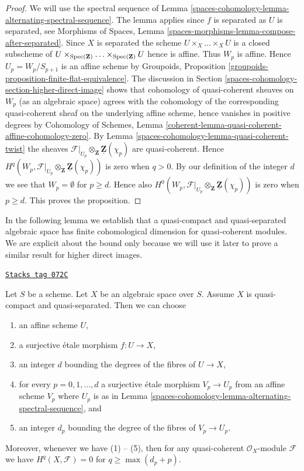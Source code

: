 \begin{proof}
We will use the spectral sequence of
Lemma \ref{spaces-cohomology-lemma-alternating-spectral-sequence}.
The lemma applies since $f$ is separated as $U$ is separated, see
Morphisms of Spaces, Lemma
\ref{spaces-morphisms-lemma-compose-after-separated}.
Since $X$ is separated the scheme $U \times_X \ldots \times_X U$ is a closed
subscheme of
$U \times_{\operatorname{Spec}(\mathbf{Z})} \ldots \times_{\operatorname{Spec}(\mathbf{Z})} U$
hence is affine. Thus $W_p$ is affine. Hence $U_p = W_p/S_{p + 1}$ is an
affine scheme by
Groupoids, Proposition \ref{groupoids-proposition-finite-flat-equivalence}.
The discussion in
Section \ref{spaces-cohomology-section-higher-direct-image}
shows that cohomology of quasi-coherent sheaves on $W_p$ (as an algebraic
space) agrees with the cohomology of the corresponding quasi-coherent
sheaf on the underlying affine scheme, hence vanishes in positive degrees by
Cohomology of Schemes, Lemma
\ref{coherent-lemma-quasi-coherent-affine-cohomology-zero}.
By
Lemma \ref{spaces-cohomology-lemma-quasi-coherent-twist}
the sheaves
$\mathcal{F}|_{U_p} \otimes_\mathbf{Z} \underline{\mathbf{Z}}(\chi_p)$
are quasi-coherent. Hence
$H^q(W_p,
\mathcal{F}|_{U_p} \otimes_\mathbf{Z} \underline{\mathbf{Z}}(\chi_p))$
is zero when $q > 0$. By our definition of the integer $d$ we see that
$W_p = \emptyset$ for $p \geq d$. Hence also
$H^0(W_p,
\mathcal{F}|_{U_p} \otimes_\mathbf{Z} \underline{\mathbf{Z}}(\chi_p))$
is zero when $p \geq d$.
This proves the proposition.
\end{proof}

In the following lemma we establish that a quasi-compact and
quasi-separated algebraic space has finite cohomological dimension
for quasi-coherent modules. We are explicit about the bound only because
we will use it later to prove a similar result for higher direct
images.

\begin{lemma}
\label{spaces-cohomology-lemma-vanishing-quasi-separated}
\href{https://stacks.math.columbia.edu/tag/072C}{\texttt{Stacks tag 072C}}

Let $S$ be a scheme. Let $X$ be an algebraic space over $S$.
Assume $X$ is quasi-compact and quasi-separated.
Then we can choose
\begin{enumerate}
\item an affine scheme $U$,
\item a surjective \'etale morphism $f : U \to X$,
\item an integer $d$ bounding the degrees of the fibres of $U \to X$,
\item for every $p = 0, 1, \ldots, d$ a surjective \'etale morphism
$V_p \to U_p$ from an affine scheme $V_p$ where $U_p$ is as in
Lemma \ref{spaces-cohomology-lemma-alternating-spectral-sequence}, and
\item an integer $d_p$ bounding the degree of the fibres of $V_p \to U_p$.
\end{enumerate}
Moreover, whenever we have (1) -- (5), then for any quasi-coherent
$\mathcal{O}_X$-module $\mathcal{F}$ we have $H^q(X, \mathcal{F}) = 0$ for
$q \geq \max(d_p + p)$.
\end{lemma}

